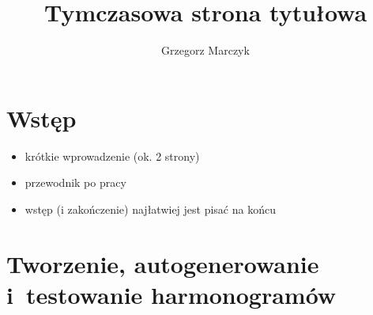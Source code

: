 \documentclass[a4paper]{book}
\title{Tymczasowa strona tytułowa}
\author{Grzegorz Marczyk}
\begin{document}
\kslistofremarks

\cleardoublepage

	



\mainmatter

\pagestyle{tylkoNumeryStron}

\chapter{Wstęp}
\pagestyle{NumeryStronNazwyRozdzialow}

\begin{itemize}
\item krótkie wprowadzenie (ok. 2 strony)
\item przewodnik po pracy
\item wstęp (i zakończenie) najłatwiej jest pisać na końcu
\end{itemize}

\chapter{Tworzenie, autogenerowanie i~testowanie harmonogramów}

\end{document}

